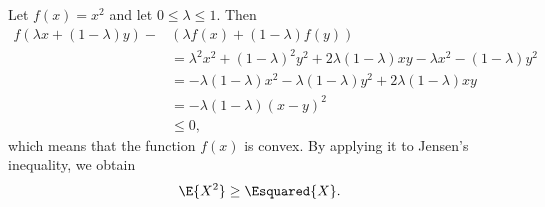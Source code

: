 Let $f(x)=x^2$ and let $0\le\lambda\le1$.
Then
\begin{align*}
    f(\lambda x+(1-\lambda)y)-{}&(\lambda f(x)+(1-\lambda)f(y)) \\
    &= \lambda^2x^2+(1-\lambda)^2y^2+2\lambda(1-\lambda)xy-\lambda x^2-(1-\lambda)y^2 \\
    &= -\lambda(1-\lambda)x^2-\lambda(1-\lambda)y^2+2\lambda(1-\lambda)xy \\
    &= -\lambda(1-\lambda)(x-y)^2 \\
    &\le 0,
\end{align*}
which means that the function $f(x)$ is convex.
By applying it to Jensen's inequality, we obtain
\[
    \E{X^2} \ge \Esquared{X}.
\]

